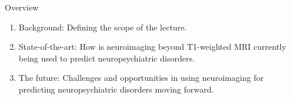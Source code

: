 \documentclass[10pt]{beamer}
\subtitle{The role of neuroimaging beyond T1-weighted MRI in the diagnosis and prediction of neuropsychiatric disorders}
\author{Esten H. Leonardsen}
\date{26.10.23}
\begin{document}
	\begin{frame}
	 	\titlepage
	\end{frame}

    \begin{frame}{Overview}
        \begin{enumerate}
            \item Background: Defining the scope of the lecture.
            \item State-of-the-art: How is neuroimaging beyond T1-weighted MRI currently being used to predict neuropsychiatric disorders.
            \item The future: Challenges and opportunities in using neuroimaging for predicting neuropsychiatric disorders moving forward.
        \end{enumerate}
    \end{frame}

    \newsavebox{\modalities}

    \newcommand{\stickman}[2]{
        \node[circle,fill,minimum size=2.5mm,#2] (head) at #1 {};
        \node[rounded corners=1pt,minimum height=0.65cm,minimum width=0.2cm,fill,below = 0.5pt of head,#2] (body) {};
        \draw[line width=0.5mm,round cap-round cap,#2] ([shift={(1pt,-0.5pt)}]body.north east) --++(-90:3mm);
        \draw[line width=0.5mm,round cap-round cap,#2] ([shift={(-1pt,-0.5pt)}]body.north west)--++(-90:3mm);
        \draw[thick,white,-round cap] (body.south) --++(90:2.75mm);
    }
\end{document}
